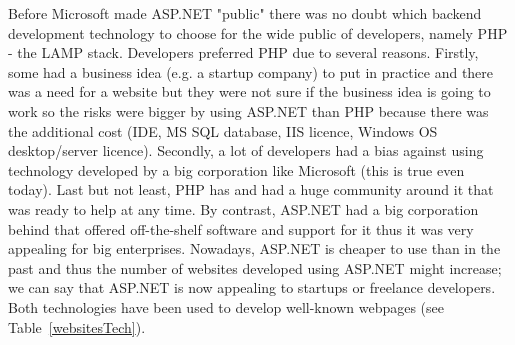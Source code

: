 \documentclass[11]{article}
\begin{document}
	Before Microsoft made ASP.NET "public" there was no doubt which backend development technology to choose for the wide public of developers, namely PHP - the LAMP stack. Developers preferred PHP due to several reasons. Firstly,  some had a business idea (e.g. a startup company) to put in practice and there was a need for a website but they were not sure if the business idea is going to work so the risks were bigger by using ASP.NET than PHP because there was the additional cost (IDE, MS SQL database, IIS licence, Windows OS desktop/server licence). Secondly, a lot of developers had a bias against using technology developed by a big corporation like Microsoft (this is true even today). Last but not least, PHP has and had a huge community around it that was ready to help at any time. By contrast, ASP.NET had a big corporation behind that offered off-the-shelf software and support for it thus it was very appealing for big enterprises. Nowadays, ASP.NET is cheaper to use than in the past and thus the number of websites developed using ASP.NET might increase; we can say that ASP.NET is now appealing to startups or freelance developers. Both technologies have been used to develop well-known webpages (see Table~\ref{websitesTech}). \\ 
\end{document}
